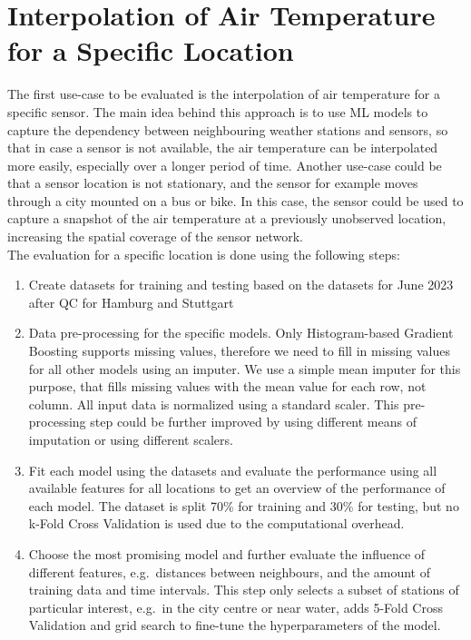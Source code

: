 \section{Interpolation of Air Temperature for a Specific Location}

The first use-case to be evaluated is the interpolation of air temperature for a specific sensor. The main idea behind this approach is to use ML models to capture the dependency between neighbouring weather stations and sensors, so that in case a sensor is not available, the air temperature can be interpolated more easily, especially over a longer period of time. Another use-case could be that a sensor location is not stationary, and the sensor for example moves through a city mounted on a bus or bike. In this case, the sensor could be used to capture a snapshot of the air temperature at a previously unobserved location, increasing the spatial coverage of the sensor network.\\
The evaluation for a specific location is done using the following steps:

\begin{enumerate}
  \item Create datasets for training and testing based on the datasets for June 2023 after QC for Hamburg and Stuttgart
  \item Data pre-processing for the specific models. Only Histogram-based Gradient Boosting supports missing values, therefore we need to fill in missing values for all other models using an imputer. We use a simple mean imputer for this purpose, that fills missing values with the mean value for each row, not column. All input data is normalized using a standard scaler. This pre-processing step could be further improved by using different means of imputation or using different scalers.
  \item Fit each model using the datasets and evaluate the performance using all available features for all locations to get an overview of the performance of each model. The dataset is split 70\% for training and 30\% for testing, but no k-Fold Cross Validation is used due to the computational overhead.
  \item Choose the most promising model and further evaluate the influence of different features, e.g.\ distances between neighbours, and the amount of training data and time intervals. This step only selects a subset of stations of particular interest, e.g.\ in the city centre or near water, adds 5-Fold Cross Validation and grid search to fine-tune the hyperparameters of the model.
\end{enumerate}

